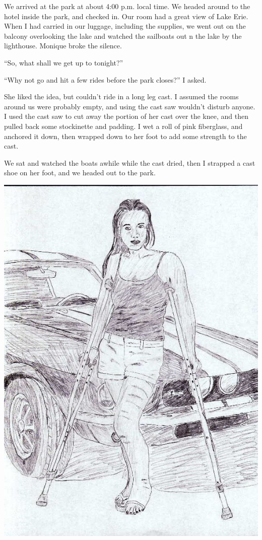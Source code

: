 We arrived at the park at about 4:00 p.m. local time. We headed around to the hotel inside
the park, and checked in. Our room had a great view of Lake Erie. When I had carried in our
luggage, including the supplies, we went out on the balcony overlooking the lake and watched the
sailboats out n the lake by the lighthouse. Monique broke the silence.

``So, what shall we get up to tonight?''

``Why not go and hit a few rides before the park closes?'' I asked.

She liked the idea, but couldn't ride in a long leg cast. I assumed the rooms around us
were probably empty, and using the cast saw wouldn't disturb anyone. I used the cast saw to cut
away the portion of her cast over the knee, and then pulled back some stockinette and padding. I
wet a roll of pink fiberglass, and anchored it down, then wrapped down to her foot to add some
strength to the cast.

We sat and watched the boats awhile while the cast dried, then I strapped a cast shoe on her
foot, and we headed out to the park.

\newpage
\begin{center}
\includegraphics{images/kicks29.jpg}
\end{center}
